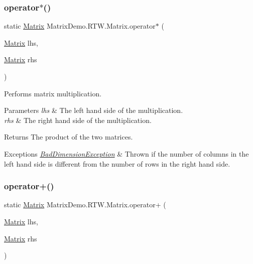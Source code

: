 \subsubsection{\texorpdfstring{operator$\ast$()}{operator*()}\hspace{0.1cm}{\footnotesize\ttfamily [2/2]}}
{\footnotesize\ttfamily static \mbox{\hyperlink{class_matrix_demo_1_1_r_t_w_1_1_matrix}{Matrix}} Matrix\+Demo.\+R\+T\+W.\+Matrix.\+operator$\ast$ (\begin{DoxyParamCaption}\item[{\mbox{\hyperlink{class_matrix_demo_1_1_r_t_w_1_1_matrix}{Matrix}}}]{lhs,  }\item[{\mbox{\hyperlink{class_matrix_demo_1_1_r_t_w_1_1_matrix}{Matrix}}}]{rhs }\end{DoxyParamCaption})\hspace{0.3cm}{\ttfamily [static]}}



Performs matrix multiplication. 


\begin{DoxyParams}{Parameters}
{\em lhs} & The left hand side of the multiplication.\\
\hline
{\em rhs} & The right hand side of the multiplication.\\
\hline
\end{DoxyParams}
\begin{DoxyReturn}{Returns}
The product of the two matrices.
\end{DoxyReturn}

\begin{DoxyExceptions}{Exceptions}
{\em \mbox{\hyperlink{class_matrix_demo_1_1_r_t_w_1_1_bad_dimension_exception}{Bad\+Dimension\+Exception}}} & Thrown if the number of columns in the left hand side is different from the number of rows in the right hand side.\\
\hline
\end{DoxyExceptions}
\mbox{\label{class_matrix_demo_1_1_r_t_w_1_1_matrix_a6c0787446dfff85088742793f129729a}} 
\subsubsection{\texorpdfstring{operator+()}{operator+()}}
{\footnotesize\ttfamily static \mbox{\hyperlink{class_matrix_demo_1_1_r_t_w_1_1_matrix}{Matrix}} Matrix\+Demo.\+R\+T\+W.\+Matrix.\+operator+ (\begin{DoxyParamCaption}\item[{\mbox{\hyperlink{class_matrix_demo_1_1_r_t_w_1_1_matrix}{Matrix}}}]{lhs,  }\item[{\mbox{\hyperlink{class_matrix_demo_1_1_r_t_w_1_1_matrix}{Matrix}}}]{rhs }\end{DoxyParamCaption})\hspace{0.3cm}{\ttfamily [static]}}



